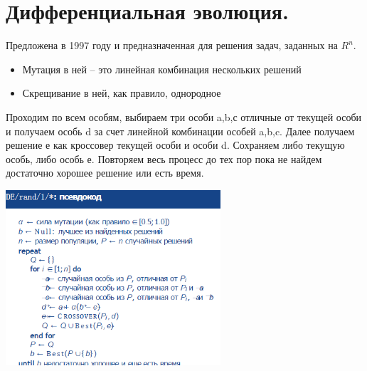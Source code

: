 \section{Дифференциальная эволюция.}

Предложена в 1997 году и предназначенная для решения задач, заданных на  $R^n$.

\begin{itemize}
      \item Мутация в ней – это линейная комбинация нескольких решений
      \item Скрещивание в ней, как правило, однородное
   \end{itemize}

Проходим по всем особям, выбираем три особи a,b,с отличные от текущей особи и получаем особь  d  за счет линейной комбинации особей a,b,c.  Далее получаем решение е как кроссовер текущей особи и особи d. Сохраняем либо текущую особь, либо особь е. Повторяем весь процесс до тех пор пока не найдем достаточно хорошее решение или есть время.

\includegraphics[width=8cm]{images/15bilet.png}  